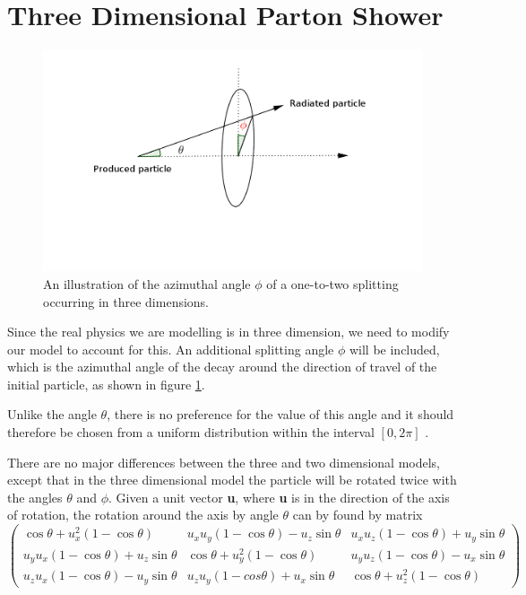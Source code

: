 \section{Three Dimensional Parton Shower}

\begin{figure}[hbtp]
\centering
\includegraphics[scale=.5]{images/three-dimentions.png}
\caption{An illustration of the azimuthal angle $\phi$ of a one-to-two splitting occurring in three dimensions.}\label{fig:3d}
\end{figure}
Since the real physics we are modelling is in three dimension, we need to modify our model to account for this. An additional splitting angle $\phi$ will be included, which is the azimuthal angle of the decay  around the direction of travel of the initial particle, as shown in figure \ref{fig:3d}.

Unlike the angle $\theta$, there is no preference for the value of this angle and it should therefore be chosen from a uniform distribution within the interval $[0,2\pi]$ \citep{Salam:2010zt}.

There are no major differences between the three and two dimensional models, except that in the three dimensional model the particle will be rotated twice with the angles $\theta$ and $\phi$. Given a unit vector \textbf{u}, where \textbf{u} is
in the direction of the axis of rotation,  the rotation around the axis by angle $\theta$ can by found by matrix       
\begin{equation} 
\begin{pmatrix}
\cos\theta + u^2_x(1-\cos\theta) & u_x u_y (1-\cos\theta) - u_z \sin\theta& u_x u_z(1-\cos\theta)+ u_y \sin\theta\\

u_y u_x (1 - \cos\theta) + u_z \sin\theta & \cos\theta + u_y^2 (1 - \cos\theta) & u_y u_z (1 - \cos\theta) - u_x \sin\theta \\

u_z u_x (1 - \cos\theta) - u_y \sin\theta & u_z u_y (1 - cos\theta) + u_x \sin\theta & \cos\theta + u_z^2 (1 - \cos\theta)
\end{pmatrix}
\end{equation}

